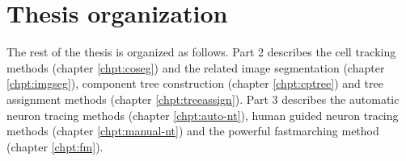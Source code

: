 \section{Thesis organization}
The rest of the thesis is organized as follows. Part 2 describes the cell tracking methods (chapter \ref{chpt:coseg}) and the related image segmentation (chapter \ref{chpt:imgseg}), component tree construction (chapter \ref{chpt:cptree}) and tree assignment methods (chapter \ref{chpt:treeassign}). Part 3 describes the automatic neuron tracing methods (chapter \ref{chpt:auto-nt}), human guided neuron tracing methods (chapter \ref{chpt:manual-nt}) and the powerful fastmarching method (chapter \ref{chpt:fm}).

